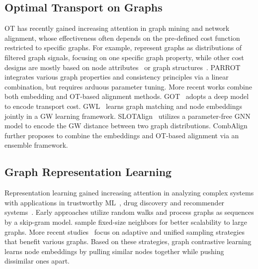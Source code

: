 \subsection{Optimal Transport on Graphs}
OT has recently gained increasing attention in graph mining and network alignment, whose effectiveness often depends on the pre-defined cost function restricted to specific graphs.
For example, \cite{got, walign, fgot,yan2024trainable} represent graphs as distributions of filtered graph signals, focusing on one specific graph property, while other cost designs are mostly based on node attributes~\cite{got2} or graph structures~\cite{goat}. PARROT~\cite{parrot} integrates various graph properties and consistency principles via a linear combination, but requires arduous parameter tuning.
More recent works combine both embedding and OT-based alignment methods.
GOT~\cite{got2} adopts a deep model to encode transport cost. GWL~\cite{gwl} learns graph matching and node embeddings jointly in a GW learning framework. SLOTAlign~\cite{slotalign} utilizes a parameter-free GNN model to encode the GW distance between two graph distributions.
CombAlign~\cite{combalign} further proposes to combine the embeddings and OT-based alignment via an ensemble framework.

\vspace{-3pt}
\subsection{Graph Representation Learning}
Representation learning gained increasing attention in analyzing complex systems with applications in trustworthy ML~\cite{liu2024aim,yoo2024ensuring,fu2023privacy,bao2024adarc}, drug discovery \cite{wei2022impact,wu2023risk,zhang2024clinical,sui2024cancer} and recommender systems~\cite{liu2024collaborative,zeng2024interformer,wei2024towards}.
Early approaches \cite{perozzi2014deepwalk,grover2016node2vec} utilize random walks and process graphs as sequences by a skip-gram model. \cite{Hamilton2017Inductive,zeng2019graphsaint} sample fixed-size neighbors for better scalability to large graphs. More recent studies~\cite{huang2018adaptive,yan2024reconciling} focus on adaptive and unified sampling strategies that benefit various graphs.
Based on these strategies, graph contrastive learning\cite{velivckovic2018deep,jing2022coin,jing2024sterling,zheng2024pyg,Sun2020InfoGraph} learns node embeddings by pulling similar nodes together while pushing dissimilar ones apart.

